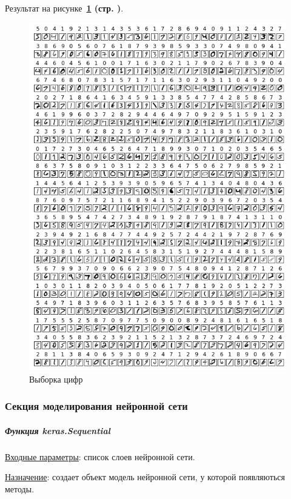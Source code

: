 Результат на рисунке~\textbf{\ref{fig:4_x_train} (стр. \pageref{fig:4_x_train})}.

\begin{figure}[!htbp]
    \centering
    \includegraphics[width=14.6cm]
    {_INCLUDES/main/4/x_train.png}
    \caption{Выборка цифр}
    \label{fig:4_x_train}
\end{figure}



\subsubsection{Секция моделирования нейронной сети}


\subparagraph{Функция keras.Sequential} \hspace{0pt}

\underline{Входные параметры}: список слоев нейронной сети.

\underline{Назначение}: создает объект модель нейронной сети, у которой появляються методы.

